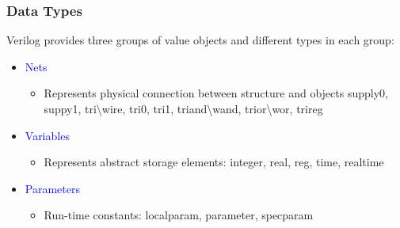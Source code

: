 \documentclass[t, notes, xcolor=table]{beamer}
\begin{document}
\begin{frame}
\frametitle{Data Types}

Verilog provides three groups of value objects and different types in each group:
\begin{itemize}
\item \textcolor{blue}{Nets}
\begin{itemize}
	\item Represents physical connection between structure and objects supply0, suppy1, tri\textbackslash wire, tri0, tri1, triand\textbackslash wand, trior\textbackslash wor, trireg
\end{itemize}
\item \textcolor{blue}{Variables}
\begin{itemize}
	\item Represents abstract storage elements: integer, real, reg, time, realtime 
\end{itemize}
\item \textcolor{blue}{Parameters}
\begin{itemize}
	\item Run-time constants: localparam, parameter, specparam
\end{itemize}
\end{itemize}
\end{frame}
\end{document}
